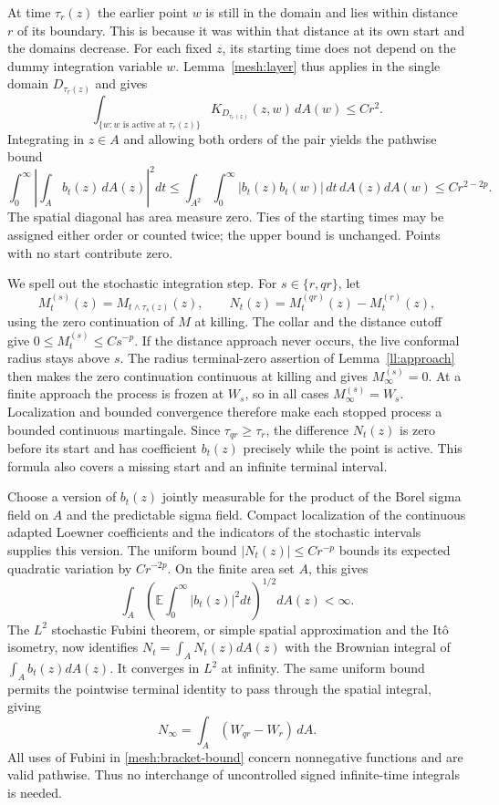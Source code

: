 At time $\tau_r(z)$ the earlier point $w$ is still in the domain and
lies within distance $r$ of its boundary.  This is because it was
within that distance at its own start and the domains decrease.
For each fixed $z$, its starting time does not depend on the dummy
integration variable $w$.  Lemma~\ref{mesh:layer} thus applies in the
single domain $D_{\tau_r(z)}$ and gives
\[
 \int_{\{w:\text{$w$ is active at $\tau_r(z)$}\}}
 K_{D_{\tau_r(z)}}(z,w)\,dA(w)\le Cr^2.
\]
Integrating in $z\in A$ and allowing both orders of the pair yields
the pathwise bound
\begin{equation}
 \int_0^\infty\left|\int_A b_t(z)\,dA(z)\right|^2dt
 \le\int_{A^2}\int_0^\infty |b_t(z)b_t(w)|\,dt\,dA(z)dA(w)
 \le Cr^{2-2p}.
 \label{mesh:bracket-bound}
\end{equation}
The spatial diagonal has area measure zero.  Ties of the starting
times may be assigned either order or counted twice; the upper bound
is unchanged.  Points with no start contribute zero.

We spell out the stochastic integration step.  For $s\in\{r,qr\}$,
let
\[
 M_t^{(s)}(z)=M_{t\wedge\tau_s(z)}(z),
 \qquad N_t(z)=M_t^{(qr)}(z)-M_t^{(r)}(z),
\]
using the zero continuation of $M$ at killing.  The collar and the
distance cutoff give $0\le M_t^{(s)}\le Cs^{-p}$.
If the distance approach never occurs, the live conformal radius
stays above $s$.  The radius terminal-zero assertion of
Lemma~\ref{ll:approach} then makes the zero continuation continuous
at killing and gives $M_\infty^{(s)}=0$.  At a finite approach the
process is frozen at $W_s$, so in all cases $M_\infty^{(s)}=W_s$.
Localization and bounded convergence therefore make each
stopped process a bounded continuous martingale.  Since
$\tau_{qr}\ge\tau_r$, the difference $N_t(z)$ is zero before its
start and has coefficient $b_t(z)$ precisely while the point is
active.  This formula also covers a missing start and an infinite
terminal interval.

Choose a version of $b_t(z)$ jointly measurable for the product of
the Borel sigma field on $A$ and the predictable sigma field.
Compact localization of the continuous adapted Loewner coefficients
and the indicators of the stochastic intervals supplies this version.  The
uniform bound $|N_t(z)|\le Cr^{-p}$ bounds its expected quadratic
variation by $Cr^{-2p}$.  On the finite area set $A$, this gives
\[
 \int_A\left(\mathbb E\int_0^\infty |b_t(z)|^2dt\right)^{1/2}
 dA(z)<\infty.
\]
The $L^2$ stochastic Fubini theorem, or simple spatial approximation
and the It\^o isometry, now identifies
$N_t=\int_A N_t(z)dA(z)$ with the Brownian integral of
$\int_A b_t(z)dA(z)$.  It converges in $L^2$ at infinity.  The same
uniform bound permits the pointwise terminal identity to pass through
the spatial integral, giving
\[
 N_\infty=\int_A(W_{qr}-W_r)\,dA.
\]
All uses of Fubini in \eqref{mesh:bracket-bound} concern nonnegative
functions and are valid pathwise.  Thus no interchange of
uncontrolled signed infinite-time integrals is needed.

